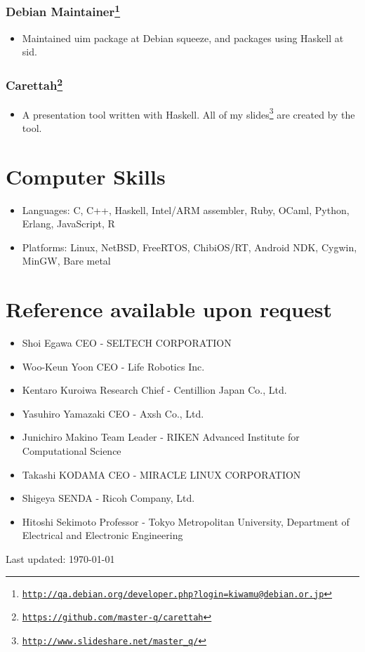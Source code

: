 \documentclass[letterpaper]{article}
\def\footer{
  \begin{center}
    \begin{footnotesize}
      Last updated: \today
    \end{footnotesize}
  \end{center}
}
\begin{document}
\subsubsection*{Debian Maintainer\footnote{\href{http://qa.debian.org/developer.php?login=kiwamu@debian.or.jp}{\tt http://qa.debian.org/developer.php?login=kiwamu@debian.or.jp}}}
\begin{itemize}
\item Maintained uim package at Debian squeeze, and packages using Haskell at sid.
\end{itemize}

\subsubsection*{Carettah\footnote{\href{https://github.com/master-q/carettah}{\tt https://github.com/master-q/carettah}}}
\begin{itemize}
\item A presentation tool written with Haskell. All of my slides\footnote{\href{http://www.slideshare.net/master\_q/}{\tt http://www.slideshare.net/master\_q/}} are created by the tool.
\end{itemize}

\section*{Computer Skills}

\begin{itemize}
  \item Languages: C, C++, Haskell, Intel/ARM assembler, Ruby, OCaml, Python, Erlang, JavaScript, R
  \item Platforms: Linux, NetBSD, FreeRTOS, ChibiOS/RT, Android NDK, Cygwin, MinGW, Bare metal
\end{itemize}

\section*{Reference available upon request}

\begin{itemize}
  \item Shoi Egawa CEO - SELTECH CORPORATION
  \item Woo-Keun Yoon CEO - Life Robotics Inc.
  \item Kentaro Kuroiwa Research Chief - Centillion Japan Co., Ltd.
  \item Yasuhiro Yamazaki CEO - Axsh Co., Ltd.
  \item Junichiro Makino Team Leader - RIKEN Advanced Institute for Computational Science
  \item Takashi KODAMA CEO - MIRACLE LINUX CORPORATION
  \item Shigeya SENDA - Ricoh Company, Ltd.
  \item Hitoshi Sekimoto Professor - Tokyo Metropolitan University, Department of Electrical and Electronic Engineering
\end{itemize}

\bigskip
\footer
\end{document}
